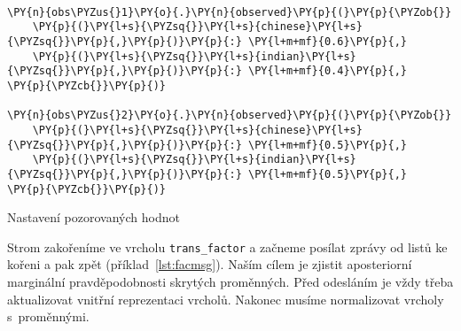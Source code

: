 \begin{example}
\begin{Verbatim}[commandchars=\\\{\}]

\PY{n}{obs\PYZus{}1}\PY{o}{.}\PY{n}{observed}\PY{p}{(}\PY{p}{\PYZob{}}
	\PY{p}{(}\PY{l+s}{\PYZsq{}}\PY{l+s}{chinese}\PY{l+s}{\PYZsq{}}\PY{p}{,}\PY{p}{)}\PY{p}{:} \PY{l+m+mf}{0.6}\PY{p}{,}
	\PY{p}{(}\PY{l+s}{\PYZsq{}}\PY{l+s}{indian}\PY{l+s}{\PYZsq{}}\PY{p}{,}\PY{p}{)}\PY{p}{:} \PY{l+m+mf}{0.4}\PY{p}{,}
\PY{p}{\PYZcb{}}\PY{p}{)}

\PY{n}{obs\PYZus{}2}\PY{o}{.}\PY{n}{observed}\PY{p}{(}\PY{p}{\PYZob{}}
	\PY{p}{(}\PY{l+s}{\PYZsq{}}\PY{l+s}{chinese}\PY{l+s}{\PYZsq{}}\PY{p}{,}\PY{p}{)}\PY{p}{:} \PY{l+m+mf}{0.5}\PY{p}{,}
	\PY{p}{(}\PY{l+s}{\PYZsq{}}\PY{l+s}{indian}\PY{l+s}{\PYZsq{}}\PY{p}{,}\PY{p}{)}\PY{p}{:} \PY{l+m+mf}{0.5}\PY{p}{,}
\PY{p}{\PYZcb{}}\PY{p}{)}
\end{Verbatim}
\caption{Nastavení pozorovaných hodnot}
\label{lst:facobs}
\end{example}

%

Strom zakořeníme ve vrcholu \texttt{trans\_factor} a začneme posílat zprávy od listů ke kořeni a pak zpět (příklad~\ref{lst:facmsg}).
Naším cílem je zjistit aposteriorní marginální pravděpodobnosti skrytých proměnných.
Před odesláním je vždy třeba aktualizovat vnitřní reprezentaci vrcholů.
Nakonec musíme normalizovat vrcholy s~proměnnými.

